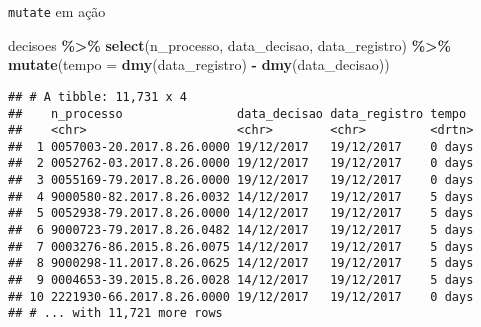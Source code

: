 \documentclass[
  10pt,
  ignorenonframetext,
]{beamer}
\newenvironment{Shaded}{\begin{snugshade}}{\end{snugshade}}
\newcommand{\DataTypeTok}[1]{\textcolor[rgb]{0.13,0.29,0.53}{#1}}
\newcommand{\KeywordTok}[1]{\textcolor[rgb]{0.13,0.29,0.53}{\textbf{#1}}}
\newcommand{\NormalTok}[1]{#1}
\newcommand{\OperatorTok}[1]{\textcolor[rgb]{0.81,0.36,0.00}{\textbf{#1}}}
\newcommand{\StringTok}[1]{\textcolor[rgb]{0.31,0.60,0.02}{#1}}
\begin{document}
\begin{frame}[fragile]{\texttt{mutate} em ação}
\protect\hypertarget{mutate-em-auxe7uxe3o}{}
\begin{Shaded}
\begin{Highlighting}[]
\NormalTok{decisoes }\OperatorTok{\%\textgreater{}\%}\StringTok{ }
\StringTok{  }\KeywordTok{select}\NormalTok{(n\_processo, data\_decisao, data\_registro) }\OperatorTok{\%\textgreater{}\%}\StringTok{ }
\StringTok{  }\KeywordTok{mutate}\NormalTok{(}\DataTypeTok{tempo =} \KeywordTok{dmy}\NormalTok{(data\_registro) }\OperatorTok{{-}}\StringTok{ }\KeywordTok{dmy}\NormalTok{(data\_decisao))}
\end{Highlighting}
\end{Shaded}

\begin{verbatim}
## # A tibble: 11,731 x 4
##    n_processo                data_decisao data_registro tempo 
##    <chr>                     <chr>        <chr>         <drtn>
##  1 0057003-20.2017.8.26.0000 19/12/2017   19/12/2017    0 days
##  2 0052762-03.2017.8.26.0000 19/12/2017   19/12/2017    0 days
##  3 0055169-79.2017.8.26.0000 19/12/2017   19/12/2017    0 days
##  4 9000580-82.2017.8.26.0032 14/12/2017   19/12/2017    5 days
##  5 0052938-79.2017.8.26.0000 14/12/2017   19/12/2017    5 days
##  6 9000723-79.2017.8.26.0482 14/12/2017   19/12/2017    5 days
##  7 0003276-86.2015.8.26.0075 14/12/2017   19/12/2017    5 days
##  8 9000298-11.2017.8.26.0625 14/12/2017   19/12/2017    5 days
##  9 0004653-39.2015.8.26.0028 14/12/2017   19/12/2017    5 days
## 10 2221930-66.2017.8.26.0000 19/12/2017   19/12/2017    0 days
## # ... with 11,721 more rows
\end{verbatim}
\end{frame}
\end{document}
